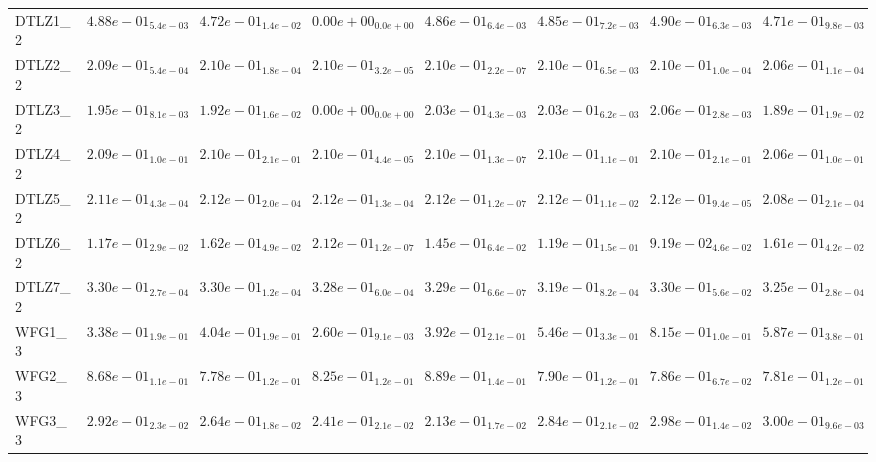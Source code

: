 \documentclass{article}
\begin{document}
\begin{landscape}
\begin{table}
\begin{scriptsize}
\begin{tabular}{llllllll}
DTLZ1\_2 & \cellcolor{gray25}$  4.88e-01_{ 5.4e-03}$ & $  4.72e-01_{ 1.4e-02}$ & $  0.00e+00_{ 0.0e+00}$ & $  4.86e-01_{ 6.4e-03}$ & $  4.85e-01_{ 7.2e-03}$ & \cellcolor{gray95}$  4.90e-01_{ 6.3e-03}$ & $  4.71e-01_{ 9.8e-03}$ \\
DTLZ2\_2 & $  2.09e-01_{ 5.4e-04}$ & \cellcolor{gray25}$  2.10e-01_{ 1.8e-04}$ & $  2.10e-01_{ 3.2e-05}$ & $  2.10e-01_{ 2.2e-07}$ & $  2.10e-01_{ 6.5e-03}$ & \cellcolor{gray95}$  2.10e-01_{ 1.0e-04}$ & $  2.06e-01_{ 1.1e-04}$ \\
DTLZ3\_2 & $  1.95e-01_{ 8.1e-03}$ & $  1.92e-01_{ 1.6e-02}$ & $  0.00e+00_{ 0.0e+00}$ & $  2.03e-01_{ 4.3e-03}$ & \cellcolor{gray25}$  2.03e-01_{ 6.2e-03}$ & \cellcolor{gray95}$  2.06e-01_{ 2.8e-03}$ & $  1.89e-01_{ 1.9e-02}$ \\
DTLZ4\_2 & $  2.09e-01_{ 1.0e-01}$ & \cellcolor{gray25}$  2.10e-01_{ 2.1e-01}$ & $  2.10e-01_{ 4.4e-05}$ & $  2.10e-01_{ 1.3e-07}$ & $  2.10e-01_{ 1.1e-01}$ & \cellcolor{gray95}$  2.10e-01_{ 2.1e-01}$ & $  2.06e-01_{ 1.0e-01}$ \\
DTLZ5\_2 & $  2.11e-01_{ 4.3e-04}$ & \cellcolor{gray25}$  2.12e-01_{ 2.0e-04}$ & $  2.12e-01_{ 1.3e-04}$ & $  2.12e-01_{ 1.2e-07}$ & $  2.12e-01_{ 1.1e-02}$ & \cellcolor{gray95}$  2.12e-01_{ 9.4e-05}$ & $  2.08e-01_{ 2.1e-04}$ \\
DTLZ6\_2 & $  1.17e-01_{ 2.9e-02}$ & \cellcolor{gray25}$  1.62e-01_{ 4.9e-02}$ & \cellcolor{gray95}$  2.12e-01_{ 1.2e-07}$ & $  1.45e-01_{ 6.4e-02}$ & $  1.19e-01_{ 1.5e-01}$ & $  9.19e-02_{ 4.6e-02}$ & $  1.61e-01_{ 4.2e-02}$ \\
DTLZ7\_2 & $  3.30e-01_{ 2.7e-04}$ & \cellcolor{gray25}$  3.30e-01_{ 1.2e-04}$ & $  3.28e-01_{ 6.0e-04}$ & $  3.29e-01_{ 6.6e-07}$ & $  3.19e-01_{ 8.2e-04}$ & \cellcolor{gray95}$  3.30e-01_{ 5.6e-02}$ & $  3.25e-01_{ 2.8e-04}$ \\
WFG1\_3 & $  3.38e-01_{ 1.9e-01}$ & $  4.04e-01_{ 1.9e-01}$ & $  2.60e-01_{ 9.1e-03}$ & $  3.92e-01_{ 2.1e-01}$ & $  5.46e-01_{ 3.3e-01}$ & \cellcolor{gray95}$  8.15e-01_{ 1.0e-01}$ & \cellcolor{gray25}$  5.87e-01_{ 3.8e-01}$ \\
WFG2\_3 & \cellcolor{gray25}$  8.68e-01_{ 1.1e-01}$ & $  7.78e-01_{ 1.2e-01}$ & $  8.25e-01_{ 1.2e-01}$ & \cellcolor{gray95}$  8.89e-01_{ 1.4e-01}$ & $  7.90e-01_{ 1.2e-01}$ & $  7.86e-01_{ 6.7e-02}$ & $  7.81e-01_{ 1.2e-01}$ \\
WFG3\_3 & $  2.92e-01_{ 2.3e-02}$ & $  2.64e-01_{ 1.8e-02}$ & $  2.41e-01_{ 2.1e-02}$ & $  2.13e-01_{ 1.7e-02}$ & $  2.84e-01_{ 2.1e-02}$ & \cellcolor{gray25}$  2.98e-01_{ 1.4e-02}$ & \cellcolor{gray95}$  3.00e-01_{ 9.6e-03}$ \\

\end{tabular}
\end{scriptsize}
\end{table}
\end{landscape}
\end{document}
